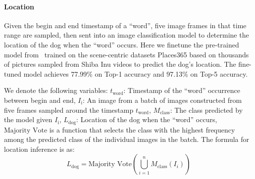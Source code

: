  \paragraph{Location} %
Given the begin and end timestamp of a ``word'', five image frames in that time range are sampled, then sent into an image classification model to determine the location of the dog when the ``word'' occurs. Here we finetune the pre-trained model from~\citet{zhou2017places} trained on the scene-centric datasets Places365 based on thousands of pictures sampled from Shiba Inu videos to predict the dog's location. The fine-tuned model achieves 77.99\% on Top-1 accuracy and 97.13\% on Top-5 accuracy. 
 
We denote the following variables:
$t_{\text{word}}$: Timestamp of the ``word'' occurrence between begin and end, %
$I_{\text{i}}$: An image from a batch of images constructed from five frames sampled around the timestamp $t_{\text{word}}$,
$M_{\text{class}}$: The class predicted by the model given $I_{\text{i}}$,
$L_{\text{dog}}$: Location of the dog when the ``word'' occurs,
$\text{Majority Vote}$ is a function that selects the class with the highest frequency among the predicted class of the individual images in the batch.
The formula for location inference is as:
\begin{equation}
L_{\text{dog}} = \text{Majority Vote}\left(\bigcup_{i=1}^{n} M_{\text{class}}(I_i)\right)
\end{equation}



